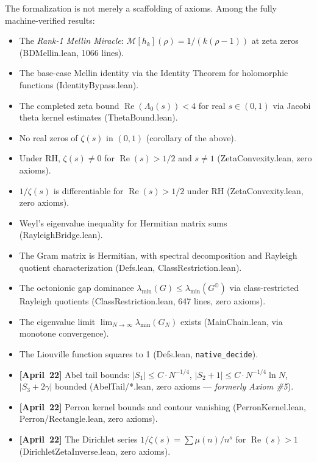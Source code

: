 \documentclass[11pt,a4paper]{article}
\theoremstyle{definition}
\newcommand{\re}{\operatorname{Re}}
\newcommand{\lean}[1]{\texttt{#1}}
\begin{document}
The formalization is not merely a scaffolding of axioms. Among the fully
machine-verified results:

\begin{itemize}
  \item The \emph{Rank-1 Mellin Miracle}: $\mathcal{M}[h_k](\rho) =
    1/(k(\rho-1))$ at zeta zeros (BDMellin.lean, 1066 lines).
  \item The base-case Mellin identity via the Identity Theorem for
    holomorphic functions (IdentityBypass.lean).
  \item The completed zeta bound $\re(\Lambda_0(s)) < 4$ for real
    $s \in (0,1)$ via Jacobi theta kernel estimates (ThetaBound.lean).
  \item No real zeros of $\zeta(s)$ in $(0,1)$ (corollary of the above).
  \item Under RH, $\zeta(s) \neq 0$ for $\re(s) > 1/2$ and $s \neq 1$
    (ZetaConvexity.lean, zero axioms).
  \item $1/\zeta(s)$ is differentiable for $\re(s) > 1/2$ under RH
    (ZetaConvexity.lean, zero axioms).
  \item Weyl's eigenvalue inequality for Hermitian matrix sums
    (RayleighBridge.lean).
  \item The Gram matrix is Hermitian, with spectral decomposition and
    Rayleigh quotient characterization (Defs.lean, ClassRestriction.lean).
  \item The octonionic gap dominance $\lambda_{\min}(G) \le
    \lambda_{\min}(G^{\mathbb{O}})$ via class-restricted Rayleigh
    quotients (ClassRestriction.lean, 647 lines, zero axioms).
  \item The eigenvalue limit $\lim_{N \to \infty} \lambda_{\min}(G_N)$
    exists (MainChain.lean, via monotone convergence).
  \item The Liouville function squares to 1 (Defs.lean, \lean{native\_decide}).
  \item \textbf{[April~22]} Abel tail bounds: $|S_1| \le C \cdot N^{-1/4}$,
    $|S_2+1| \le C \cdot N^{-1/4} \ln N$, $|S_3+2\gamma|$ bounded
    (AbelTail/*.lean, zero axioms --- \emph{formerly Axiom \#5}).
  \item \textbf{[April~22]} Perron kernel bounds and contour vanishing
    (PerronKernel.lean, Perron/Rectangle.lean, zero axioms).
  \item \textbf{[April~22]} The Dirichlet series $1/\zeta(s) =
    \sum \mu(n)/n^s$ for $\re(s) > 1$ (DirichletZetaInverse.lean, zero axioms).
\end{itemize}
\end{document}
